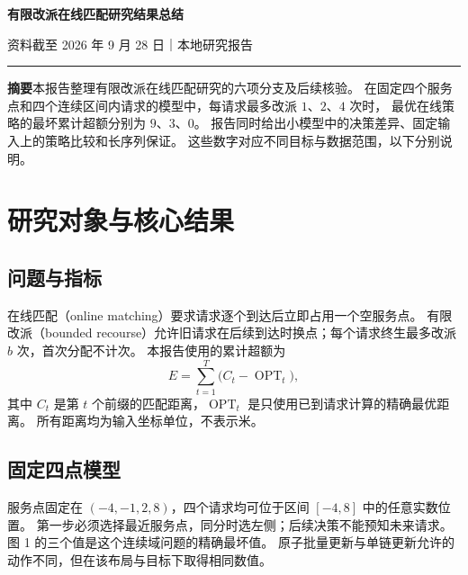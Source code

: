 \documentclass[UTF8,11pt,a4paper,landscape,fontset=windows]{ctexart}
\begin{document}
\begin{center}
  {\LARGE\bfseries 有限改派在线匹配研究结果总结}\par\vspace{4pt}
  {\small 资料截至 2026 年 9 月 28 日\quad｜\quad 本地研究报告}
\end{center}
\noindent\rule{\linewidth}{0.5pt}

\noindent\textbf{摘要}\quad 本报告整理有限改派在线匹配研究的六项分支及后续核验。
在固定四个服务点和四个连续区间内请求的模型中，每请求最多改派 $1$、$2$、$4$ 次时，
最优在线策略的最坏累计超额分别为 $9$、$3$、$0$。
报告同时给出小模型中的决策差异、固定输入上的策略比较和长序列保证。
这些数字对应不同目标与数据范围，以下分别说明。

\section{研究对象与核心结果}
\noindent\begin{minipage}[t]{0.48\linewidth}
\vspace{0pt}
\subsection*{问题与指标}
在线匹配（online matching）要求请求逐个到达后立即占用一个空服务点。
有限改派（bounded recourse）允许旧请求在后续到达时换点；每个请求终生最多改派 $b$ 次，首次分配不计次。
本报告使用的累计超额为
\[
  E=\sum_{t=1}^{T}\bigl(C_t-\operatorname{OPT}_t\bigr),
\]
其中 $C_t$ 是第 $t$ 个前缀的匹配距离，$\operatorname{OPT}_t$ 是只使用已到请求计算的精确最优距离。
所有距离均为输入坐标单位，不表示米。

\subsection*{固定四点模型}
服务点固定在 $(-4,-1,2,8)$，四个请求均可位于区间 $[-4,8]$ 中的任意实数位置。
第一步必须选择最近服务点，同分时选左侧；后续决策不能预知未来请求。
图 1 的三个值是这个连续域问题的精确最坏值。
原子批量更新与单链更新允许的动作不同，但在该布局与目标下取得相同数值。
\end{minipage}\hfill
\end{document}
